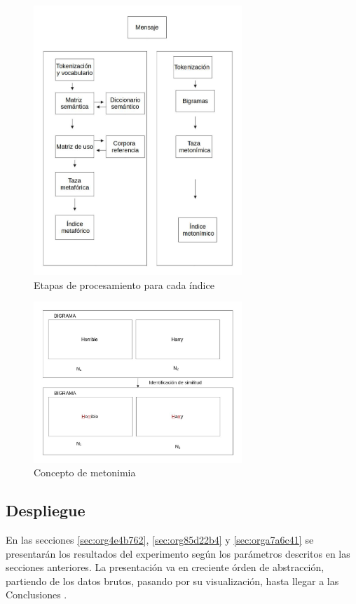 \documentclass[12pt,letterpaper,twoside]{article}
\begin{document}
\begin{figure}[H]
\centering
\includegraphics[width=0.7\textwidth]{./assets/metodologia.jpg}
\caption{\label{fig:metodologia}Etapas de procesamiento para cada índice}
\end{figure}

\begin{figure}[H]
\centering
\includegraphics[width=0.7\textwidth]{./assets/metonimia.jpg}
\caption{\label{fig:metonimia}Concepto de metonimia}
\end{figure}

\subsection{Despliegue}
\label{sec:org54c877c}
En las secciones \ref{sec:org4e4b762}, \ref{sec:org85d22b4} y
\ref{sec:orga7a6c41} se presentarán los resultados del experimento
según los parámetros descritos en las secciones anteriores.
La presentación va en creciente órden de abstracción, partiendo
de los datos brutos, pasando por su visualización, hasta llegar
a las Conclusiones .
\end{document}
